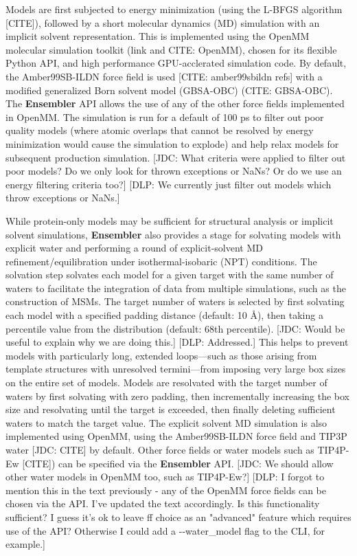 \documentclass[aps,pre,twocolumn,nofootinbib,superscriptaddress,linenumbers]{revtex4-1}
\begin{document}
Models are first subjected to energy minimization (using the L-BFGS algorithm {\color{red}[CITE]}), followed by a short molecular dynamics (MD) simulation with an implicit solvent representation.
This is implemented using the OpenMM molecular simulation toolkit (link and CITE: OpenMM), chosen for its flexible Python API, and high performance GPU-acclerated simulation code.
By default, the Amber99SB-ILDN force field is used {\color{red}[CITE: amber99sbildn refs]} with a modified generalized Born solvent model (GBSA-OBC) (CITE: GBSA-OBC).
The {\bf Ensembler} API allows the use of any of the other force fields implemented in OpenMM.
The simulation is run for a default of 100 ps to filter out poor quality models (where atomic overlaps that cannot be resolved by energy minimization would cause the simulation to explode) and help relax models for subsequent production simulation.
{\color{red}[JDC: What criteria were applied to filter out poor models?  Do we only look for thrown exceptions or NaNs?  Or do we use an energy filtering criteria too?]}
{\color{blue}[DLP: We currently just filter out models which throw exceptions or NaNs.]}

While protein-only models may be sufficient for structural analysis or implicit solvent simulations, {\bf Ensembler} also provides a stage for solvating models with explicit water and performing a round of explicit-solvent MD refinement/equilibration under isothermal-isobaric (NPT) conditions.
The solvation step solvates each model for a given target with the same number of waters to facilitate the integration of data from multiple simulations, such as the construction of MSMs.
The target number of waters is selected by first solvating each model with a specified padding distance (default: 10 \AA), then taking a percentile value from the distribution (default: 68th percentile).
{\color{red}[JDC: Would be useful to explain why we are doing this.]}
{\color{blue}[DLP: Addressed.]}
This helps to prevent models with particularly long, extended loops---such as those arising from template structures with unresolved termini---from imposing very large box sizes on the entire set of models.
Models are resolvated with the target number of waters by first solvating with zero padding, then incrementally increasing the box size and resolvating until the target is exceeded, then finally deleting sufficient waters to match the target value.
The explicit solvent MD simulation is also implemented using OpenMM, using the Amber99SB-ILDN force field and TIP3P water {\color{red}[JDC: CITE]} by default.
Other force fields or water models such as TIP4P-Ew {\color{red}[CITE]}) can be specified via the {\bf Ensembler} API.
{\color{red}[JDC: We should allow other water models in OpenMM too, such as TIP4P-Ew?]}
{\color{blue}[DLP: I forgot to mention this in the text previously - any of the OpenMM force fields can be chosen via the API. I've updated the text accordingly. Is this functionality sufficient? I guess it's ok to leave ff choice as an "advanced" feature which requires use of the API? Otherwise I could add a -{}-water\_model flag to the CLI, for example.]}
\end{document}
